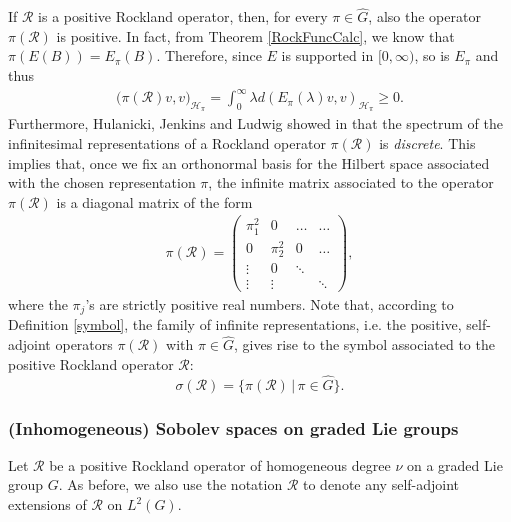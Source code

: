 \documentclass[12pt,oneside,a4paper]{book}
\numberwithin{equation}{section}     %
\theoremstyle{plain}
\theoremstyle{definition}
\begin{document}
If $\mathcal R$ is a positive Rockland operator, then, for every $\pi\in\widehat{G}$, also the operator $\pi(\mathcal{R})$ is positive. In fact, from Theorem \ref{RockFuncCalc}, we know that $\pi(E(B))=E_\pi(B)$. Therefore, since $E$ is supported in $[0,\infty)$, so is $E_\pi$ and thus
\begin{align*}
\big(\pi(\mathcal{R})v,v\big)_{\mathcal{H}_\pi}=\int_{0}^{\infty}\lambda d(E_\pi(\lambda)v,v)_{\mathcal{H}_\pi}\geq 0.
\end{align*}
Furthermore, Hulanicki, Jenkins and Ludwig showed in \cite{HJL1985} that the spectrum of the infinitesimal representations of a Rockland operator $\pi(\mathcal R)$ is \textit{discrete}. This implies that, once we fix an orthonormal basis for the Hilbert space associated with the chosen representation $\pi$, the infinite matrix associated to the operator $\pi(\mathcal{R})$ is a diagonal matrix of the form
\begin{align}\label{eq:symbRock}
\pi(\mathcal R)=\begin{pmatrix}
\pi^2_1 & 0      & \dots    & \dots \\
0      & \pi^2_2 & 0    & \dots \\
\vdots&   0       & \ddots  &          \\
\vdots& \vdots  &             & \ddots
\end{pmatrix},
\end{align}
where the $\pi_j$'s are strictly positive real numbers. Note that, according to Definition \ref{symbol}, the family of infinite representations, i.e. the positive, self-adjoint operators $\pi(\mathcal{R})$ with $\pi\in\widehat{G}$, gives rise to the symbol associated to the positive Rockland operator $\mathcal R$:
\[
\sigma(\mathcal R)=\big\{\pi(\mathcal R)\,|\, \pi\in\widehat G\big\}.
\]
\subsubsection{(Inhomogeneous) Sobolev spaces on graded Lie groups}

Let $\mathcal R$ be a positive Rockland operator of homogeneous degree $\nu$ on a graded Lie group $G$. As before, we also use the notation $\mathcal R$ to denote any self-adjoint extensions of $\mathcal R$ on $L^2(G)$. 
\end{document}
